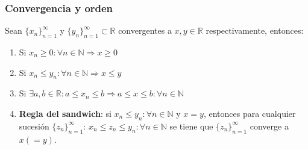 \documentclass[10pt,a4paper,openright]{book}
\begin{document}
\subsubsection*{Convergencia y orden}
Sean $\{x_n\}_{n=1}^\infty$ y $\{y_n\}_{n=1}^\infty\subset \mathbb R$ convergentes a $x,y\in \mathbb R$ respectivamente, entonces:
\begin{enumerate}
\item Si $x_n\geq 0: \forall n \in \mathbb N\Rightarrow x\geq 0$

\item Si $x_n\leq y_n: \forall n \in \mathbb N\Rightarrow x\leq y$

\item Si $\exists a,b\in \mathbb R: a\leq x_n\leq b\Rightarrow a\leq x\leq b: \forall n \in \mathbb N$

\item \textbf{Regla del sandwich}: si $x_n\leq y_n: \forall n \in \mathbb N$ y $x=y$, entonces para cualquier sucesión $\{z_n\}_{n=1}^\infty $: $x_n\leq z_n\leq y_n: \forall n \in \mathbb N$ se tiene que $\{z_n\}_{n=1}^\infty $ converge a $x(=y)$.
\end{enumerate}
\end{document}

